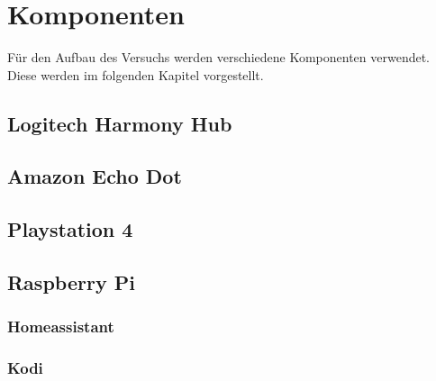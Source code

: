 \section{Komponenten}\label{sec:komponenten}
Für den Aufbau des Versuchs werden verschiedene Komponenten verwendet.
Diese werden im folgenden Kapitel vorgestellt.

\subsection[Logitech Harmony Hub]{Logitech Harmony Hub \cite{HarmonyH15:online}}\label{sec:harmony}

\subsection{Amazon Echo Dot}\label{sec:komp-echo}

\subsection{Playstation 4}\label{sec:komp-playstation}

\subsection{Raspberry Pi}\label{sec:komp-rpi}

\subsubsection{Homeassistant}\label{sec:komp-rpi-homeassistant}

\subsubsection{Kodi}\label{sec:komp-rpi-kodi}
